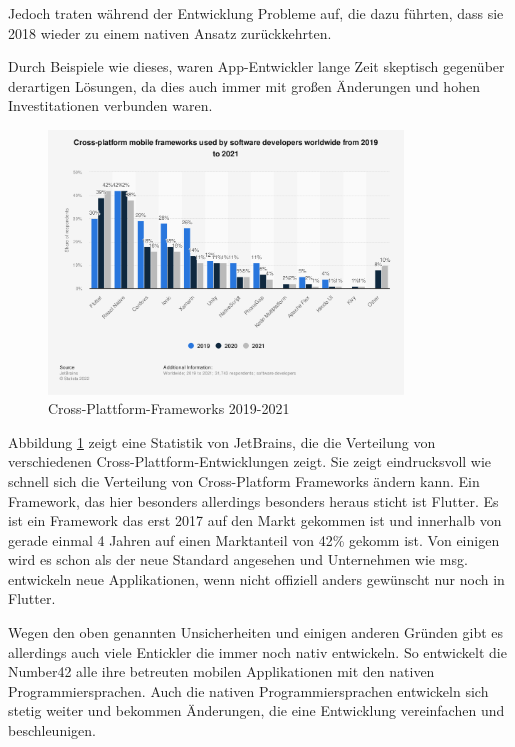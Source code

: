 Jedoch traten während der Entwicklung Probleme auf, die dazu führten, dass sie 2018 wieder zu einem nativen Ansatz zurückkehrten.

Durch Beispiele wie dieses, waren App-Entwickler lange Zeit skeptisch gegenüber derartigen Lösungen, da dies auch immer mit großen Änderungen und hohen Investitationen verbunden waren.

\begin{figure}[ht]
  \centering
  \includegraphics[height=7cm,keepaspectratio]{images/cross-platform-mobile-frameworks.png} 
  \caption{Cross-Plattform-Frameworks 2019-2021 \cite{statist_CP_Framework}}
  \label{fig:statista_cross_plattform}
\end{figure}
Abbildung \ref{fig:statista_cross_plattform} zeigt eine Statistik von JetBrains, die die Verteilung von verschiedenen Cross-Plattform-Entwicklungen zeigt. Sie zeigt eindrucksvoll wie schnell sich die Verteilung von Cross-Platform Frameworks ändern kann.
Ein Framework, das hier besonders allerdings besonders heraus sticht ist Flutter. Es ist ein Framework das erst 2017 auf den Markt gekommen ist und innerhalb von gerade einmal 4 Jahren auf einen Marktanteil von 42\% gekomm ist. Von einigen wird es schon als der neue Standard angesehen und Unternehmen wie msg. entwickeln neue Applikationen, wenn nicht offiziell anders gewünscht nur noch in Flutter.

Wegen den oben genannten Unsicherheiten und einigen anderen Gründen gibt es allerdings auch viele Entickler die immer noch nativ entwickeln. So entwickelt die Number42 alle ihre betreuten mobilen Applikationen mit den nativen Programmiersprachen. Auch die nativen Programmiersprachen entwickeln sich stetig weiter und bekommen Änderungen, die eine Entwicklung vereinfachen und beschleunigen.



